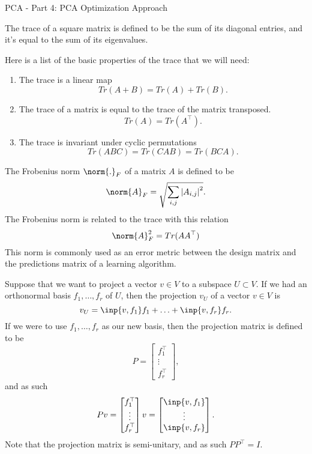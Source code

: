 \begin{entry}[1]{PCA - Part 4: PCA Optimization Approach}

\begin{entrysection} 
The trace of a square matrix is defined to be the sum of its diagonal entries, and it's equal to the sum of its eigenvalues.
\end{entrysection}

\begin{entrysection} 
Here is a list of the basic properties of the trace that we will need:
\begin{enumerate}
\item The trace is a linear map
\[ Tr(A + B) = Tr(A) + Tr(B).\]
\item The trace of a matrix is equal to the trace of the matrix transposed. 
\[Tr(A) = Tr(A^{\top}).\]
\item The trace is invariant under cyclic permutations
\[ Tr(ABC) = Tr(CAB) = Tr(BCA). \]
\end{enumerate}
\end{entrysection}

\begin{entrysection} 
The Frobenius norm $\norm{.}_F$ of a matrix $A$ is defined to be
\[ \norm{A}_F = \sqrt{\sum_{i, j}\left|A_{i, j}\right|^2}. \]
The Frobenius norm is related to the trace with this relation
\[ \norm{A}_F^2 = Tr(AA^{\top}) \]
This norm is commonly used as an error metric between the design matrix and the predictions matrix of a learning algorithm. 
\end{entrysection}

\begin{entrysection} 
Suppose that we want to project a vector $v \in V$ to a subspace $U \subset V$. If we had an orthonormal basis $f_1,\ldots,f_r$ of $U$, then the projection $v_U$ of a vector $v \in V$ is
\[ v_U = \inp{v, f_1} f_1 + \ldots + \inp{v, f_r} f_r. \]
If we were to use $f_1, \ldots, f_r$ as our new basis, then the projection matrix is defined to be
\[ P = \begin{bmatrix}f_1^{\top} \\ \vdots \\ f_r^{\top}  \end{bmatrix}, \]
and as such
\[ Pv = \begin{bmatrix}f_1^{\top} \\ \vdots \\ f_r^{\top}  \end{bmatrix} v = \begin{bmatrix} \inp{v, f_1} \\ \vdots \\ \inp{v, f_r}  \end{bmatrix}. \]
Note that the projection matrix is semi-unitary, and as such $PP^{\top} = I$.
\end{entrysection}


\end{entry}
